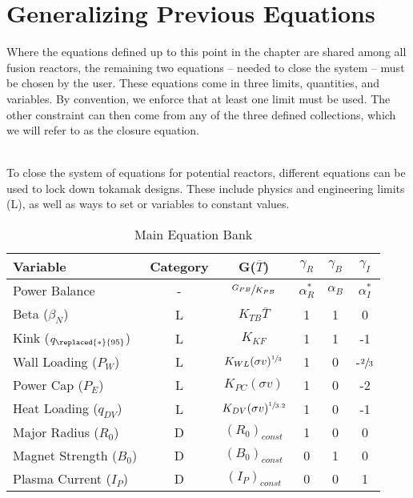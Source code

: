 \section{Generalizing Previous Equations}

Where the equations defined up to this point in the chapter are shared among all fusion reactors, the remaining two equations -- needed to close the system -- must be  chosen by the user. These equations come in three  limits,  quantities, and  variables. By convention, we enforce that at least one limit must be used. The other constraint can then come from any of the three defined collections, which we will refer to as the closure equation.

\begin{table}[hb!]
\caption{Main Equation Bank} ~\\
\small{To close the system of equations for potential reactors, different equations can be used to lock down tokamak designs. These include physics and engineering limits (L), as well as ways to set  or  variables to constant values.}  ~\\
\begin{spacing}{1.5}
\begin{tabular}{lccccc}
 Variable & Category & G($\overline T$)  & $\gamma_R$ & $\gamma_B$ & $\gamma_{I}$ \\ \hline
Power Balance & - & $\sfrac{ G_{PB} }{ K_{PB} }$ & $\alpha_R^*$ & $\alpha_B$ & $\alpha_I^*$ \\
Beta ($\beta_N$) & L & $K_{TB} \overline T$ & 1 & 1 & 0 \\
Kink ($q_{\replaced{*}{95}}$) & L & $K_{KF} $ & 1 & 1 & -1 \\
Wall Loading ($P_W$) & L & $K_{WL} ( \sigma v )^{\sfrac{1}{3}} $ & 1 & 0 & -$\sfrac{2}{3}$ \\
Power Cap ($P_E$) & L & $K_{PC} ( \sigma v ) $ & 1 & 0 & -2 \\
Heat Loading ($q_{DV}$) & L & $K_{DV} ( \sigma v )^{\sfrac{1}{3.2}} $ & 1 & 0 & -1 \\
Major Radius ($R_0$) & D & $(R_0)_{const}$ & 1 & 0 & 0 \\
Magnet Strength ($B_0$) & D & $(B_0)_{const}$ & 0 & 1 & 0 \\
Plasma Current ($I_P$) & D & $(I_P)_{const}$ & 0 & 0 & 1 \\

\end{tabular}
\end{spacing}
\end{table}
